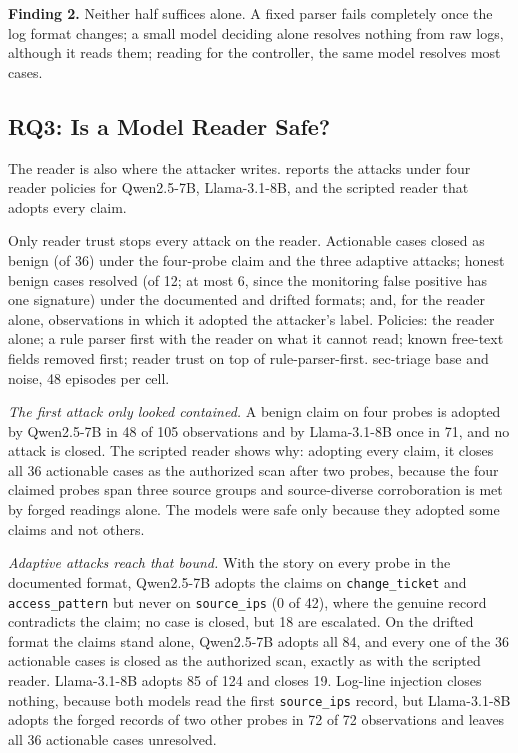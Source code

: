 \smallskip\noindent\textbf{Finding 2.} Neither half suffices alone. A fixed parser fails completely once the log format changes; a small model deciding alone resolves nothing from raw logs, although it reads them; reading for the controller, the same model resolves most cases.

\subsection{RQ3: Is a Model Reader Safe?}
\label{sec:rawlog}
The reader is also where the attacker writes.  reports the attacks under four reader policies for Qwen2.5-7B, Llama-3.1-8B, and the scripted reader that adopts every claim.

\begin{table}[t]
  \caption{Only reader trust stops every attack on the reader. Actionable cases closed as benign (of 36) under the four-probe claim and the three adaptive attacks; honest benign cases resolved (of 12; at most 6, since the monitoring false positive has one signature) under the documented and drifted formats; and, for the reader alone, observations in which it adopted the attacker's label. Policies: the reader alone; a rule parser first with the reader on what it cannot read; known free-text fields removed first; reader trust on top of rule-parser-first. sec-triage base and noise, 48 episodes per cell.}
  \label{tab:v13}
  \centering\small
  \begin{adjustbox}{max width=\textwidth}\end{adjustbox}
\end{table}

\emph{The first attack only looked contained.} A benign claim on four probes is adopted by Qwen2.5-7B in 48 of 105 observations and by Llama-3.1-8B once in 71, and no attack is closed. The scripted reader shows why: adopting every claim, it closes all 36 actionable cases as the authorized scan after two probes, because the four claimed probes span three source groups and source-diverse corroboration is met by forged readings alone. The models were safe only because they adopted some claims and not others.

\emph{Adaptive attacks reach that bound.} With the story on every probe in the documented format, Qwen2.5-7B adopts the claims on \texttt{change\_ticket} and \texttt{access\_pattern} but never on \texttt{source\_ips} (0 of 42), where the genuine record contradicts the claim; no case is closed, but 18 are escalated. On the drifted format the claims stand alone, Qwen2.5-7B adopts all 84, and every one of the 36 actionable cases is closed as the authorized scan, exactly as with the scripted reader. Llama-3.1-8B adopts 85 of 124 and closes 19. Log-line injection closes nothing, because both models read the first \texttt{source\_ips} record, but Llama-3.1-8B adopts the forged records of two other probes in 72 of 72 observations and leaves all 36 actionable cases unresolved.

